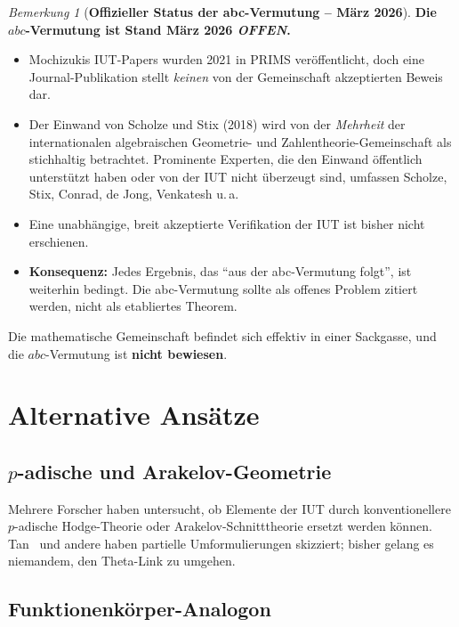 \documentclass[12pt,a4paper]{article}
\theoremstyle{remark}
\newtheorem{remark}[theorem]{Bemerkung}
\begin{document}
\begin{remark}[\textbf{Offizieller Status der abc-Vermutung -- März 2026}]
\textbf{Die $abc$-Vermutung ist Stand März 2026 \emph{OFFEN}.}
\begin{itemize}[nosep]
  \item Mochizukis IUT-Papers wurden 2021 in PRIMS veröffentlicht, doch eine
    Journal-Publikation stellt \emph{keinen} von der Gemeinschaft akzeptierten Beweis dar.
  \item Der Einwand von Scholze und Stix (2018) wird von der \emph{Mehrheit} der
    internationalen algebraischen Geometrie- und Zahlentheorie-Gemeinschaft als
    stichhaltig betrachtet. Prominente Experten, die den Einwand öffentlich unterstützt
    haben oder von der IUT nicht überzeugt sind, umfassen Scholze, Stix, Conrad,
    de Jong, Venkatesh u.\,a.
  \item Eine unabhängige, breit akzeptierte Verifikation der IUT ist bisher nicht erschienen.
  \item \textbf{Konsequenz:} Jedes Ergebnis, das ``aus der abc-Vermutung folgt'', ist
    weiterhin bedingt. Die abc-Vermutung sollte als offenes Problem zitiert werden,
    nicht als etabliertes Theorem.
\end{itemize}
\end{remark}

Die mathematische Gemeinschaft befindet sich effektiv in einer Sackgasse, und die
$abc$-Vermutung ist \textbf{nicht bewiesen}.

\section{Alternative Ansätze}

\subsection{$p$-adische und Arakelov-Geometrie}

Mehrere Forscher haben untersucht, ob Elemente der IUT durch konventionellere $p$-adische
Hodge-Theorie oder Arakelov-Schnitttheorie ersetzt werden können. Tan~\cite{Tan2022} und
andere haben partielle Umformulierungen skizziert; bisher gelang es niemandem, den
Theta-Link zu umgehen.

\subsection{Funktionenkörper-Analogon}
\end{document}
